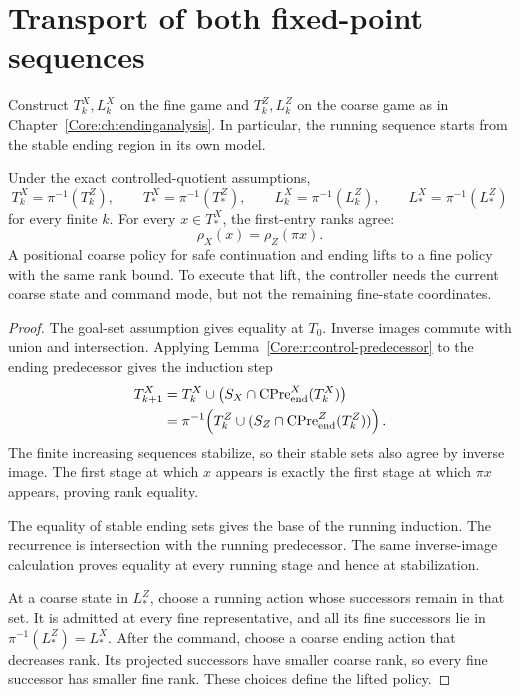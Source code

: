 \section{Transport of both fixed-point sequences}
Construct $T^X_k,L^X_k$ on the fine game and $T^Z_k,L^Z_k$ on the coarse game as in Chapter~\ref{Core:ch:endinganalysis}. In particular, the running sequence starts from the stable ending region in its own model.

\begin{Coretheorem}\label{Core:r:control-transport}
Under the exact controlled-quotient assumptions,
\[
 T^X_k=\pi^{-1}(T^Z_k),\qquad
 T^X_*=\pi^{-1}(T^Z_*),\qquad
 L^X_k=\pi^{-1}(L^Z_k),\qquad
 L^X_*=\pi^{-1}(L^Z_*)
\]
for every finite $k$. For every $x\in T^X_*$, the first-entry ranks agree:
\[
 \rho_X(x)=\rho_Z(\pi x).
\]
A positional coarse policy for safe continuation and ending lifts to a fine policy with the same rank bound. To execute that lift, the controller needs the current coarse state and command mode, but not the remaining fine-state coordinates.
\end{Coretheorem}
\begin{proof}
The goal-set assumption gives equality at $T_0$. Inverse images commute with union and intersection. Applying Lemma~\ref{Core:r:control-predecessor} to the ending predecessor gives the induction step
\begin{align*}
 T^X_{k+1}
 &=T^X_k\cup\bigl(S_X\cap\operatorname{CPre}^X_{\rm end}(T^X_k)\bigr)\\
 &=\pi^{-1}\!\left(T^Z_k\cup
       (S_Z\cap\operatorname{CPre}^Z_{\rm end}(T^Z_k))\right).
\end{align*}
The finite increasing sequences stabilize, so their stable sets also agree by inverse image. The first stage at which $x$ appears is exactly the first stage at which $\pi x$ appears, proving rank equality.

The equality of stable ending sets gives the base of the running induction. The recurrence is intersection with the running predecessor. The same inverse-image calculation proves equality at every running stage and hence at stabilization.

At a coarse state in $L^Z_*$, choose a running action whose successors remain in that set. It is admitted at every fine representative, and all its fine successors lie in $\pi^{-1}(L^Z_*)=L^X_*$. After the command, choose a coarse ending action that decreases rank. Its projected successors have smaller coarse rank, so every fine successor has smaller fine rank. These choices define the lifted policy.
\end{proof}

